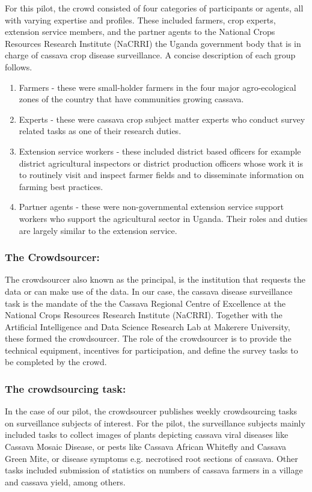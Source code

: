 \documentclass[letterpaper]{article} %
\begin{document}
For this pilot, the crowd consisted of four categories of participants or agents, all with varying expertise and profiles. These included farmers, crop experts, extension service members, and the partner agents to the National Crops Resources Research Institute (NaCRRI) the Uganda government body that is in charge of cassava crop disease surveillance. A concise description of each group follows.
\begin{enumerate}
\item Farmers - these were small-holder farmers in the four major agro-ecological zones of the country that have communities growing cassava.
\item Experts - these were cassava crop subject matter experts who conduct survey related tasks as one of their research duties.
\item Extension service workers - these included district based officers for example district agricultural inspectors or district production officers whose work it is to routinely visit and inspect farmer fields and to disseminate information on farming best practices.
\item Partner agents - these were non-governmental extension service support workers who support the agricultural sector in Uganda. Their roles and duties are largely similar to the extension service.
\end{enumerate}

\subsubsection{The Crowdsourcer:}
The crowdsourcer also known as the principal, is the institution that requests the data or can make use of the data. In our case, the cassava disease surveillance task is the mandate of the the Cassava Regional Centre of Excellence at the National Crops Resources Research Institute (NaCRRI). Together with the Artificial Intelligence and Data Science Research Lab at Makerere University, these formed the crowdsourcer. The role of the crowdsourcer is to provide the technical equipment, incentives for participation, and define the survey tasks to be completed by the crowd.

\subsubsection{The crowdsourcing task:} 
In the case of our pilot, the crowdsourcer publishes weekly crowdsourcing tasks on surveillance subjects of interest. For the pilot, the surveillance subjects mainly included tasks to collect images of plants depicting cassava viral diseases like Cassava Mosaic Disease, or pests like Cassava African Whitefly and Cassava Green Mite, or disease symptoms e.g. necrotised root sections of cassava. Other tasks included submission of statistics on numbers of cassava farmers in a village and cassava yield, among others.
\end{document}
